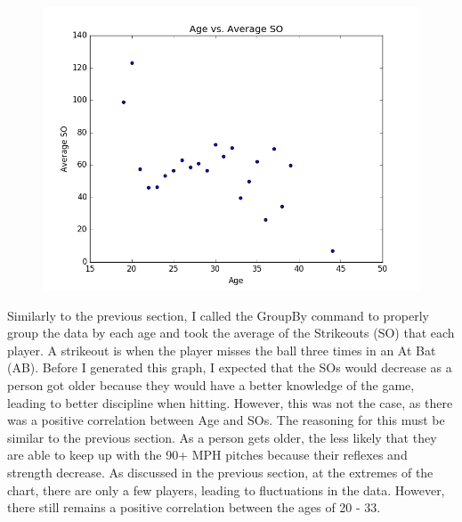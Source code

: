 \documentclass{acmart}
\begin{document}
\begin{figure}[H]
\includegraphics[scale=.5]{AgevsAverageSO.png}
\end{figure}
Similarly to the previous section, I called the GroupBy command to properly group the data by each age and took the average of the Strikeouts (SO) that each player. A strikeout is when the player misses the ball three times in an At Bat (AB). Before I generated this graph, I expected that the SOs would decrease as a person got older because they would have a better knowledge of the game, leading to better discipline when hitting. However, this was not the case, as there was a positive correlation between Age and SOs. The reasoning for this must be similar to the previous section. As a person gets older, the less likely that they are able to keep up with the 90+ MPH pitches because their reflexes and strength decrease. As discussed in the previous section, at the extremes of the chart, there are only a few players, leading to fluctuations in the data. However, there still remains a positive correlation between the ages of 20 - 33.
\end{document}
